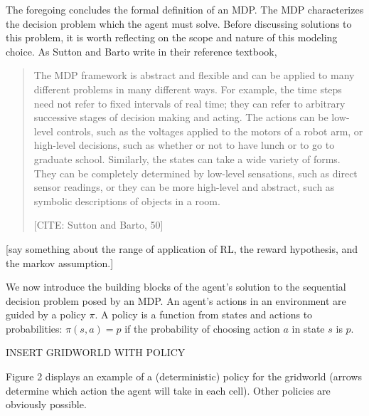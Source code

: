 The foregoing concludes the formal definition of an MDP.
The MDP characterizes the decision problem which the agent must solve.
Before discussing solutions to this problem, it is worth reflecting on the scope and nature of this modeling choice.
As Sutton and Barto write in their reference textbook,
\begin{quote}
	The MDP framework is abstract and flexible and can be applied to many different problems in many different ways.
	For example, the time steps need not refer to fixed intervals of real time; they can refer to arbitrary successive stages of decision making and acting.
	The actions can be low-level controls, such as the voltages applied to the motors of a robot arm, or high-level decisions, such as whether or not to have lunch or to go to graduate school.
	Similarly, the states can take a wide variety of forms.
	They can be completely determined by low-level sensations, such as direct sensor readings, or they can be more high-level and abstract, such as symbolic descriptions of objects in a room.

	\hfill 
	[CITE: Sutton and Barto, 50]
\end{quote}
[say something about the range of application of RL, the reward hypothesis, and the markov assumption.]

We now introduce the building blocks of the agent's solution to the sequential decision problem posed by an MDP.
An agent's actions in an environment are guided by a policy $\pi$.
A policy is a function from states and actions to probabilities: $\pi(s, a) = p$ if the probability of choosing action $a$ in state $s$ is $p$.
\begin{center}
	INSERT GRIDWORLD WITH POLICY
\end{center}
Figure 2 displays an example of a (deterministic) policy for the gridworld (arrows determine which action the agent will take in each cell).
Other policies are obviously possible.

